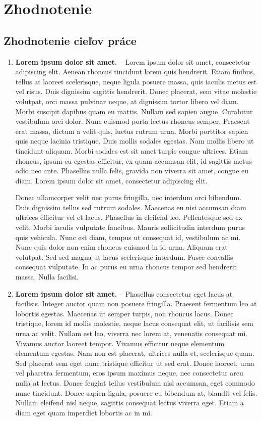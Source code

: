 \chapter{Zhodnotenie}

\section{Zhodnotenie cieľov práce}

\begin{enumerate}
    \item \textbf{Lorem ipsum dolor sit amet.} --
        Lorem ipsum dolor sit amet, consectetur adipiscing elit. Aenean rhoncus tincidunt lorem quis hendrerit. Etiam finibus, tellus at laoreet scelerisque, neque ligula posuere massa, quis iaculis metus est vel risus. Duis dignissim sagittis hendrerit. Donec placerat, sem vitae molestie volutpat, orci massa pulvinar neque, at dignissim tortor libero vel diam. Morbi suscipit dapibus quam eu mattis. Nullam sed sapien augue. Curabitur vestibulum orci dolor. Nunc euismod porta lectus rhoncus semper. Praesent erat massa, dictum a velit quis, luctus rutrum urna. Morbi porttitor sapien quis neque lacinia tristique. Duis mollis sodales egestas. Nam mollis libero ut tincidunt aliquam. Morbi sodales est sit amet turpis congue ultrices. Etiam rhoncus, ipsum eu egestas efficitur, ex quam accumsan elit, id sagittis metus odio nec ante. Phasellus nulla felis, gravida non viverra sit amet, congue eu diam. Lorem ipsum dolor sit amet, consectetur adipiscing elit.

        Donec ullamcorper velit nec purus fringilla, nec interdum orci bibendum. Duis dignissim tellus sed rutrum sodales. Maecenas eu nisi accumsan diam ultrices efficitur vel et lacus. Phasellus in eleifend leo. Pellentesque sed ex velit. Morbi iaculis vulputate faucibus. Mauris sollicitudin interdum purus quis vehicula. Nunc est diam, tempus ut consequat id, vestibulum ac mi. Nunc quis dolor non enim rhoncus euismod in id urna. Aliquam erat volutpat. Sed sed magna ut lacus scelerisque interdum. Fusce convallis consequat vulputate. In ac purus eu urna rhoncus tempor sed hendrerit massa. Nulla facilisi.
    
    \item \textbf{Lorem ipsum dolor sit amet.} -- Phasellus consectetur eget lacus at facilisis. Integer auctor quam non posuere fringilla. Praesent fermentum leo at lobortis egestas. Maecenas ut semper turpis, non rhoncus lacus. Donec tristique, lorem id mollis molestie, neque lacus consequat elit, ut facilisis sem urna ac velit. Nullam est leo, viverra nec lorem at, venenatis consequat mi. Vivamus auctor laoreet tempor. Vivamus efficitur neque elementum elementum egestas. Nam non est placerat, ultrices nulla et, scelerisque quam. Sed placerat sem eget nunc tristique efficitur ut sed erat. Donec laoreet, urna vel pharetra fermentum, eros ipsum maximus neque, nec consectetur arcu nulla at lectus. Donec feugiat tellus vestibulum nisl accumsan, eget commodo nunc tincidunt. Donec sapien ligula, posuere eu bibendum at, blandit vel felis. Nullam eleifend nisl neque, sagittis consequat lectus viverra eget. Etiam a diam eget quam imperdiet lobortis ac in mi.
\end{enumerate}

